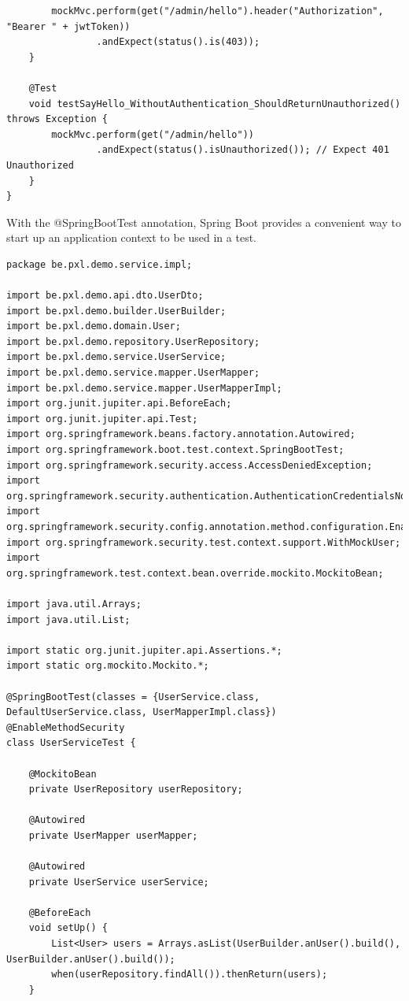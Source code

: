 \begin{lstlisting}
        mockMvc.perform(get("/admin/hello").header("Authorization", "Bearer " + jwtToken))
                .andExpect(status().is(403));
    }

    @Test
    void testSayHello_WithoutAuthentication_ShouldReturnUnauthorized() throws Exception {
        mockMvc.perform(get("/admin/hello"))
                .andExpect(status().isUnauthorized()); // Expect 401 Unauthorized
    }
}
\end{lstlisting}

With the @SpringBootTest annotation, Spring Boot provides a convenient way to start up an application context to be used in a test.

\begin{lstlisting}
package be.pxl.demo.service.impl;

import be.pxl.demo.api.dto.UserDto;
import be.pxl.demo.builder.UserBuilder;
import be.pxl.demo.domain.User;
import be.pxl.demo.repository.UserRepository;
import be.pxl.demo.service.UserService;
import be.pxl.demo.service.mapper.UserMapper;
import be.pxl.demo.service.mapper.UserMapperImpl;
import org.junit.jupiter.api.BeforeEach;
import org.junit.jupiter.api.Test;
import org.springframework.beans.factory.annotation.Autowired;
import org.springframework.boot.test.context.SpringBootTest;
import org.springframework.security.access.AccessDeniedException;
import org.springframework.security.authentication.AuthenticationCredentialsNotFoundException;
import org.springframework.security.config.annotation.method.configuration.EnableMethodSecurity;
import org.springframework.security.test.context.support.WithMockUser;
import org.springframework.test.context.bean.override.mockito.MockitoBean;

import java.util.Arrays;
import java.util.List;

import static org.junit.jupiter.api.Assertions.*;
import static org.mockito.Mockito.*;

@SpringBootTest(classes = {UserService.class, DefaultUserService.class, UserMapperImpl.class})
@EnableMethodSecurity
class UserServiceTest {

    @MockitoBean
    private UserRepository userRepository;

    @Autowired
    private UserMapper userMapper;

    @Autowired
    private UserService userService;

    @BeforeEach
    void setUp() {
        List<User> users = Arrays.asList(UserBuilder.anUser().build(), UserBuilder.anUser().build());
        when(userRepository.findAll()).thenReturn(users);
    }


\end{lstlisting}
